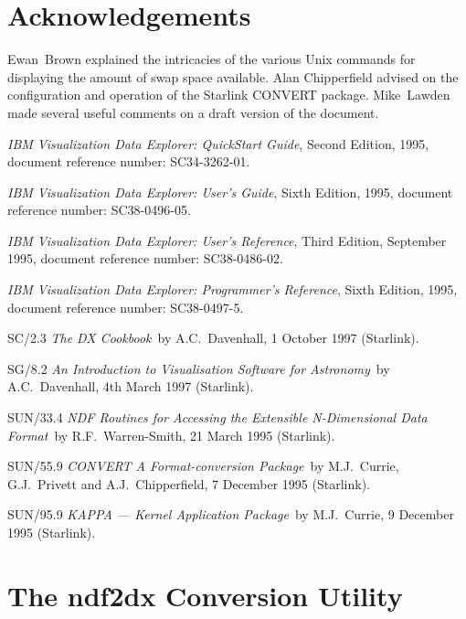 

\newpage
\section{Acknowledgements  }

Ewan~Brown explained the intricacies of the various Unix commands for
displaying the amount of swap space available. Alan Chipperfield advised
on the configuration and operation of the Starlink CONVERT package.
Mike~Lawden  made several useful comments on a draft version of the
document.

\begin{thebibliography}{99}

   {\it IBM Visualization Data Explorer: QuickStart
   Guide}, Second Edition, 1995, document reference number:
   SC34-3262-01.

   {\it IBM Visualization Data Explorer: User's Guide},
   Sixth Edition, 1995, document reference number: SC38-0496-05.

   {\it IBM Visualization Data Explorer: User's Reference},
   Third Edition, September 1995, document reference number:
   SC38-0486-02.

   {\it IBM Visualization Data Explorer: Programmer's
   Reference}, Sixth Edition, 1995, document reference number:
   SC38-0497-5.

   SC/2.3 {\it The DX Cookbook}\, by A.C.~Davenhall,
   1 October 1997 (Starlink).

   SG/8.2 {\it An Introduction to Visualisation Software
   for Astronomy}\, by A.C.~Davenhall, 4th March 1997 (Starlink).

   SUN/33.4 {\it NDF Routines for Accessing the
   Extensible N-Dimensional Data Format}\, by R.F.~Warren-Smith,
   21 March 1995 (Starlink).

   SUN/55.9 {\it CONVERT A Format-conversion Package}\,
   by M.J.~Currie, G.J.~Privett and A.J.~Chipperfield, 7 December 1995
   (Starlink).

   SUN/95.9 {\it KAPPA --- Kernel Application Package}\,
   by M.J.~Currie, 9 December 1995 (Starlink).

\end{thebibliography}

\newpage
\appendix
\section{The ndf2dx Conversion Utility \label{NDF2DX}  }

